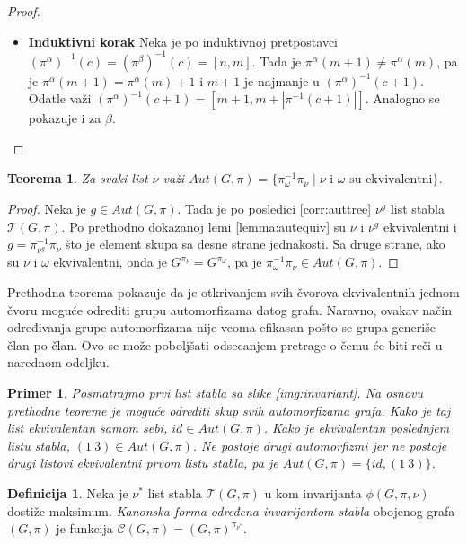 \documentclass[12pt,oneside]{memoir}
\newtheorem{theorem}{Teorema}
\newtheorem{example}{Primer}
\theoremstyle{definition}
\newtheorem*{definition}{Definicija}
\begin{document}
\begin{proof}
\begin{enumerate}
\begin{itemize}
				  \item[] \textbf{Induktivni korak} Neka je po induktivnoj
					  pretpostavci $(\pi^\alpha)^{-1}(c) = (\pi^\beta)^{-1}(c)
					  = [n, m]$. Tada je $\pi^\alpha(m+1) \neq \pi^\alpha(m)$,
					  pa je $\pi^\alpha(m+1) = \pi^\alpha(m) + 1$ i $m+1$ je
					  najmanje u $(\pi^\alpha)^{-1}(c+1)$. Odatle važi
					  $(\pi^\alpha)^{-1}(c+1) = [m + 1, m + |\pi^{-1}(c+1)|]$.
					  Analogno se pokazuje i za $\beta$.
			  \end{itemize}
	  \end{enumerate}
  \end{proof}

  \begin{theorem}
	  \label{thm:aut}
	  Za svaki list $\nu$ važi $Aut(G, \pi) = \{\pi_{\omega}^{-1}\pi_{\nu}
	  \mid \text{$\nu$ i $\omega$ su ekvivalentni} \}$.
  \end{theorem}
  
  \begin{proof}
	  Neka je $g \in Aut(G, \pi)$. Tada je po posledici \ref{corr:auttree}
	  $\nu^g$ list stabla $\mathcal{T}(G, \pi)$. Po prethodno dokazanoj lemi
	  \ref{lemma:autequiv} su $\nu$ i $\nu^g$ ekvivalentni i $g =
	  \pi_{\nu^g}^{-1}\pi_\nu$ što je element skupa sa desne strane jednakosti.
	  Sa druge strane, ako su $\nu$ i $\omega$ ekvivalentni, onda je
	  $G^{\pi_\nu} = G^{\pi_\omega}$, pa je $\pi_\omega^{-1}\pi_\nu \in Aut(G,
	  \pi)$.
  \end{proof}

	Prethodna teorema pokazuje da je otkrivanjem svih čvorova ekvivalentnih
	jednom čvoru moguće odrediti grupu automorfizama datog grafa. Naravno,
	ovakav način određivanja grupe automorfizama nije veoma efikasan pošto se
	grupa generiše član po član. Ovo se može poboljšati odsecanjem pretrage o
	čemu će biti reči u narednom odeljku.
	
	\begin{example}
		Posmatrajmo prvi list stabla sa slike \ref{img:invariant}. Na osnovu
		prethodne teoreme je moguće odrediti skup svih automorfizama grafa.
		Kako je taj list ekvivalentan samom sebi, $id \in Aut(G, \pi)$.  Kako
		je ekvivalentan poslednjem listu stabla, $(1\ 3) \in Aut(G, \pi)$. Ne
		postoje drugi automorfizmi jer ne postoje drugi listovi ekvivalentni
		prvom listu stabla, pa je $Aut(G, \pi) = \{id, (1\ 3)\}$.
	\end{example}

  \begin{definition}
	  Neka je $\nu^*$ list stabla $\mathcal{T}(G, \pi)$ u kom invarijanta
	  $\phi(G, \pi, \nu)$ dostiže maksimum. \emph{Kanonska forma određena
	  invarijantom stabla} obojenog grafa $(G, \pi)$ je funkcija
	  $\mathcal{C}(G, \pi) = (G, \pi)^{\pi_{\nu^*}}$.
  \end{definition}
\end{document}
